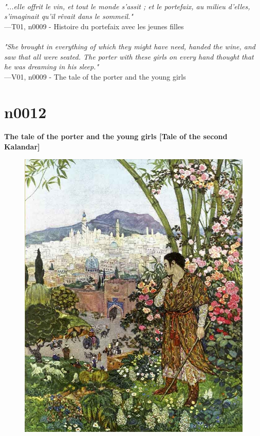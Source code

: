 \documentclass[../Carre_nights.tex]{subfiles}
\begin{document}
\textit{\\
"...elle offrit le vin, et tout le monde s’assit ; et le portefaix, au milieu d’elles, s’imaginait qu’il rêvait dans le sommeil."} \\
—T01, n0009 - Histoire du portefaix avec les jeunes filles \\~\\
\textit{"She brought in everything of which they might have need, handed the wine, and saw that all were seated. The porter with these girls on every hand thought that he was dreaming in his sleep."} \\
—V01, n0009 - The tale of the porter and the young girls

\newpage

\section{n0012}
\textbf{\Large{The tale of the porter and the young girls [Tale of the second Kalandar]}} \\

\begin{figure}[ht]
\centering
\includegraphics[height=\figsize]{illustrations/volume_1/T01, n0012 - Histoire du portefaix avec les jeunes filles [Histoire du deuxième Saâlouk].jpg}
\end{figure}
\end{document}
